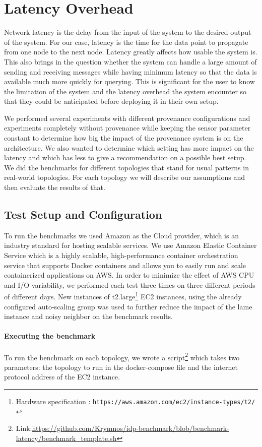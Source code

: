 \section{Latency Overhead}

Network latency is the delay from the input of the system to the desired output of the system. For our case, latency is the time for the data point to propagate from one node to the next node. Latency greatly affects how usable the system is. This also brings in the question whether the system can handle a large amount of sending and receiving messages while having minimum latency so that the data is available much more quickly for querying. 
This is significant for the user to know the limitation of the system and the latency overhead the system encounter so that they could be anticipated before deploying it in their own setup.

We performed several experiments with different provenance configurations and experiments completely without provenance while keeping the sensor parameter constant to determine how big the impact of the provenance system is on the architecture. We also wanted to determine which setting has more impact on the latency and which has less to give a recommendation on a possible best setup. We did the benchmarks for different topologies that stand for usual patterns in real-world topologies. For each topology we will describe our assumptions and then evaluate the results of that.

\subsection{Test Setup and Configuration} \label{testsetup}
To run the benchmarks we used Amazon as the Cloud provider, which is an industry standard for hosting scalable services. We use Amazon Elastic Container Service which is a highly scalable, high-performance container orchestration service that supports Docker containers and allows you to easily run and scale containerized applications on AWS. In order to minimize the effect of AWS CPU and I/O variability, we performed each test three times on three different periods of different days.  New instances of t2.large\footnote{Hardware specification : \texttt{https://aws.amazon.com/ec2/instance-types/t2/} } EC2 instances, using the already configured auto-scaling group  was used to further reduce the impact of the lame instance and noisy neighbor on the benchmark results. 


\paragraph*{Executing the benchmark}
To run the benchmark on each topology, we wrote a script\footnote{Link:\url{https://github.com/Krymnos/idp-benchmark/blob/benchmark-latency/benchmark_template.sh} } which takes two parameters: the topology to run in the docker-compose file and the internet protocol address of the EC2 instance.


